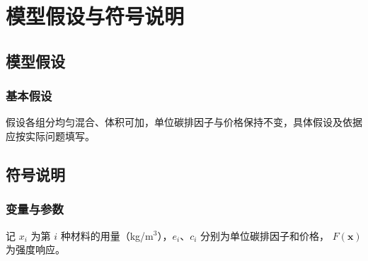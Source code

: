 \section{模型假设与符号说明}
\label{sec:assumptions}
\subsection{模型假设}
\subsubsection{基本假设}
假设各组分均匀混合、体积可加，单位碳排因子与价格保持不变，具体假设及依据应按实际问题填写。

\subsection{符号说明}
\subsubsection{变量与参数}
记 $x_i$ 为第 $i$ 种材料的用量（kg/m$^3$），$e_i$、$c_i$ 分别为单位碳排因子和价格，
$F(\boldsymbol{x})$ 为强度响应。
